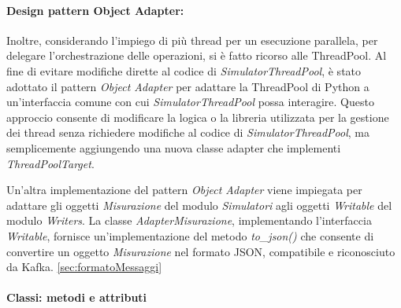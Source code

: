 \begin{itemize}
\paragraph{Design pattern Object Adapter:}
Inoltre, considerando l'impiego di più thread per un esecuzione parallela, per delegare l'orchestrazione delle operazioni, si è fatto ricorso alle ThreadPool. Al fine di evitare modifiche dirette al codice di \textit{SimulatorThreadPool}, è stato adottato il pattern \textit{Object Adapter} per adattare la ThreadPool di Python a un'interfaccia comune con cui \textit{SimulatorThreadPool} possa interagire. Questo approccio consente di modificare la logica o la libreria utilizzata per la gestione dei thread senza richiedere modifiche al codice di \textit{SimulatorThreadPool}, ma semplicemente aggiungendo una nuova classe adapter che implementi \textit{ThreadPoolTarget}.


Un'altra implementazione del pattern \textit{Object Adapter} viene impiegata per adattare gli oggetti \textit{Misurazione} del modulo \textit{Simulatori} agli oggetti \textit{Writable} del modulo \textit{Writers}. La classe \textit{AdapterMisurazione}, implementando l'interfaccia \textit{Writable}, fornisce un'implementazione del metodo \textit{to\_json()} che consente di convertire un oggetto \textit{Misurazione} nel formato JSON, compatibile e riconosciuto da Kafka.
\ref*{sec:formatoMessaggi}


\paragraph{Classi: metodi e attributi}


\end{itemize}
